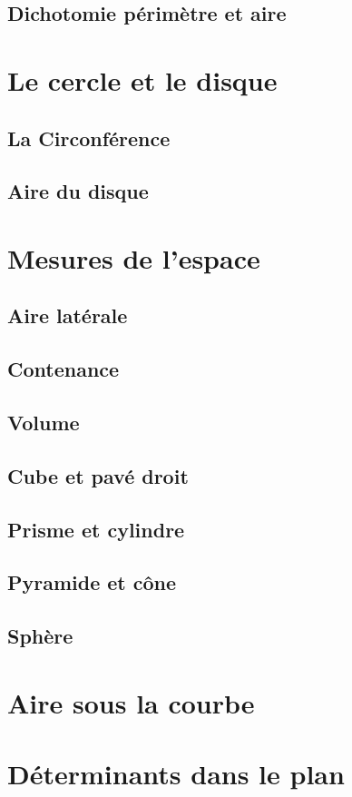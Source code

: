 
\subsection{Dichotomie périmètre et aire}

\section{Le cercle et le disque}
\subsection{La Circonférence}
\subsection{Aire du disque}


\section{Mesures de l'espace}
\subsection{Aire latérale}
\subsection{Contenance}
\subsection{Volume}
\subsection{Cube et pavé droit}
\subsection{Prisme et cylindre}
\subsection{Pyramide et cône}
\subsection{Sphère}

\section{Aire sous la courbe}

\section{Déterminants dans le plan}